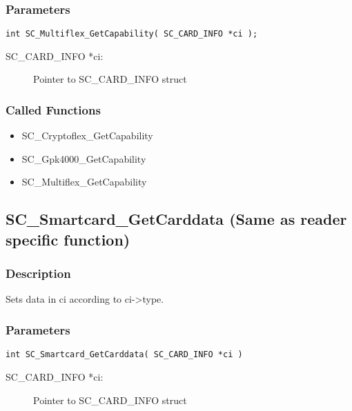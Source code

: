 \documentclass[a4paper,oneside]{article}
\begin{document}
\subsubsection*{Parameters}

\begin{verbatim}
int SC_Multiflex_GetCapability( SC_CARD_INFO *ci );
\end{verbatim}

\begin{description}
\item[SC\_CARD\_INFO *ci:] Pointer to SC\_CARD\_INFO struct
\end{description}

\subsubsection*{Called Functions}

\begin{itemize}
\item SC\_Cryptoflex\_GetCapability
\item SC\_Gpk4000\_GetCapability
\item SC\_Multiflex\_GetCapability
\end{itemize}


\subsection{SC\_Smartcard\_GetCarddata (Same as reader specific function)}

\subsubsection*{Description}

Sets data in ci according to ci->type.

\subsubsection*{Parameters}

\begin{verbatim}
int SC_Smartcard_GetCarddata( SC_CARD_INFO *ci )
\end{verbatim}

\begin{description}
\item[SC\_CARD\_INFO *ci:] Pointer to SC\_CARD\_INFO struct
\end{description}
\end{document}
